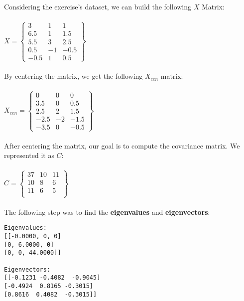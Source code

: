 Considering the exercise's dataset, we can build the following $X$ Matrix:\\
\\
$X = \begin{Bmatrix}
	3 & 1 & 1 \\
	6.5 & 1 & 1.5\\
	5.5 & 3 & 2.5\\
	0.5 & -1 & -0.5\\
	-0.5 & 1 & 0.5
\end{Bmatrix}$\\
\\
By centering the matrix, we get the following $X_{cen}$ matrix:\\
\\
$X_{cen} = \begin{Bmatrix}
0 & 0 & 0 \\
3.5 & 0 & 0.5\\
2.5 & 2 & 1.5\\
-2.5 & -2 & -1.5\\
-3.5 & 0 &-0.5
\end{Bmatrix}$\\
\\
After centering the matrix, our goal is to compute the covariance matrix. We represented it as $C:$\\
\\
$C = \begin{Bmatrix}
37 & 10 & 11 \\
10 & 8 & 6\\
11 & 6 & 5\\
\end{Bmatrix}$\\
\\
The following step was to find the \textbf{eigenvalues} and \textbf{eigenvectors}:
\begin{verbatim}
Eigenvalues:
[[-0.0000, 0, 0]
[0, 6.0000, 0]
[0, 0, 44.0000]]

Eigenvectors:
[[-0.1231 -0.4082  -0.9045]
[-0.4924  0.8165 -0.3015]
[0.8616  0.4082  -0.3015]]

\end{verbatim}


